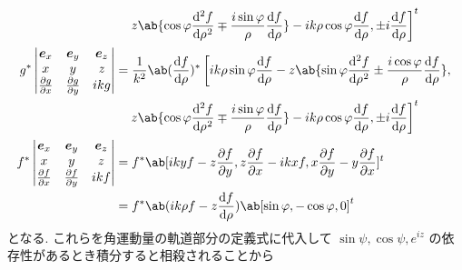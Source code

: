 \documentclass[uplatex,dvipdfmx,a4paper,11pt]{jlreq}
\newcommand\vmqty[1]{\begin{vmatrix}#1\end{vmatrix}}
\theoremstyle{definition}
\begin{document}
\begin{align}
                     & \quad \left. z\ab\{\cos\varphi\diff[2]{f}{\rho} \mp \frac{i\sin\varphi}{\rho} \diff{f}{\rho}\} - i k\rho\cos\varphi\diff{f}{\rho}, \pm i\diff{f}{\rho}\right]^t                                                                                                                                        \\
  g^*\vmqty{\bm{e}_x & \bm{e}_y                                                                                                                                                                                                                                                                         & \bm{e}_z            \\ x & y & z \\ \diffp{g}{x} & \diffp{g}{y} & i kg }
                     & = \frac{1}{k^2}\ab(\diff{f}{\rho})^*\left[i k\rho\sin\varphi\diff{f}{\rho} - z\ab\{\sin\varphi\diff[2]{f}{\rho} \pm \frac{i\cos\varphi}{\rho}\diff{f}{\rho}\},\right.                                                                                                                                  \\
                     & \quad \left. z\ab\{\cos\varphi\diff[2]{f}{\rho} \mp \frac{i\sin\varphi}{\rho} \diff{f}{\rho}\} - i k\rho\cos\varphi\diff{f}{\rho}, \pm i\diff{f}{\rho}\right]^t                                                                                                                                        \\
  f^*\vmqty{\bm{e}_x & \bm{e}_y                                                                                                                                                                                                                                                                         & \bm{e}_z            \\ x & y & z \\ \diffp{f}{x} & \diffp{f}{y} & i kf }
                     & = f^* \ab[i kyf - z\diffp{f}{y}, z\diffp{f}{x} - i kxf, x\diffp{f}{y} - y\diffp{f}{x}]^t                                                                                                                                                                                                               \\
                     & = f^* \ab(i k\rho f - z\diff{f}{\rho})\ab[\sin\varphi, -\cos\varphi, 0]^t
\end{align}
となる. これらを角運動量の軌道部分の定義式に代入して $\sin\psi, \cos\psi, e^{i z}$ の依存性があるとき積分すると相殺されることから
\end{document}
